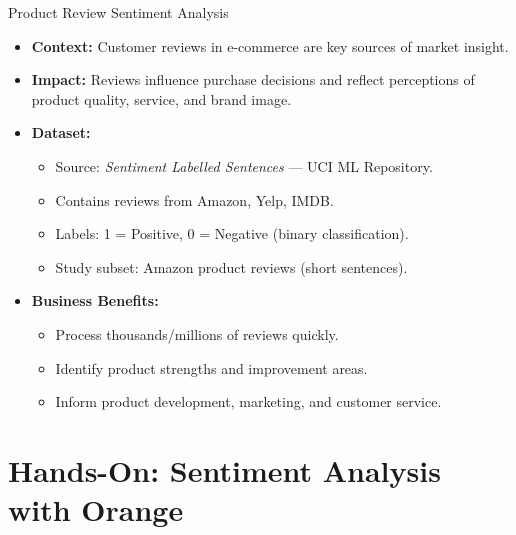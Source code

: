 \documentclass[aspectratio=169, table]{beamer}
\begin{document}
\begin{frame}{Product Review Sentiment Analysis}
	\vspace{20pt}
	\begin{itemize}
		\item \textbf{Context:} Customer reviews in e-commerce are key sources of market insight.
		\item \textbf{Impact:} Reviews influence purchase decisions and reflect perceptions of product quality, service, and brand image.
		\item \textbf{Dataset:}
		\begin{itemize}
			\item Source: \textit{Sentiment Labelled Sentences} — UCI ML Repository.
			\item Contains reviews from Amazon, Yelp, IMDB.
			\item Labels: 1 = Positive, 0 = Negative (binary classification).
			\item Study subset: Amazon product reviews (short sentences).
		\end{itemize}
		\item \textbf{Business Benefits:}
		\begin{itemize}
			\item Process thousands/millions of reviews quickly.
			\item Identify product strengths and improvement areas.
			\item Inform product development, marketing, and customer service.
		\end{itemize}
	\end{itemize}
\end{frame}

\section{Hands-On: Sentiment Analysis with Orange}
\end{document}
